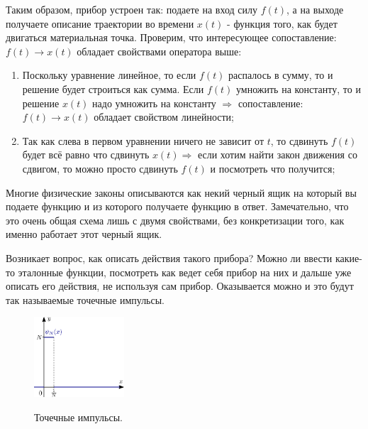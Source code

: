 \documentclass[12pt]{article}
\theoremstyle{definition}
\begin{document}
Таким образом, прибор устроен так: подаете на вход силу $f(t)$, а на выходе получаете описание траектории во времени $x(t)$ - функция того, как будет двигаться материальная точка. Проверим, что интересующее сопоставление: $f(t) \to x(t)$ обладает свойствами оператора выше:
\begin{enumerate}[label=(\arabic*)]
	\item Поскольку уравнение линейное, то если $f(t)$ распалось в сумму, то и решение будет строиться как сумма. Если $f(t)$ умножить на константу, то и решение $x(t)$ надо умножить на константу $\Rightarrow$ сопоставление: $f(t) \to x(t)$ обладает свойством линейности;
	
	\item Так как слева в первом уравнении ничего не зависит от $t$, то сдвинуть $f(t)$ будет всё равно что сдвинуть $x(t) \Rightarrow$ если хотим найти закон движения со сдвигом, то можно просто сдвинуть $f(t)$ и посмотреть что получится;
\end{enumerate}
Многие физические законы описываются как некий черный ящик на который вы подаете функцию и из которого получаете функцию в ответ. Замечательно, что это очень общая схема лишь с двумя свойствами, без конкретизации того, как именно работает этот черный ящик.

Возникает вопрос, как описать действия такого прибора? Можно ли ввести какие-то эталонные функции, посмотреть как ведет себя прибор на них и дальше уже описать его действия, не используя сам прибор. Оказывается можно и это будут так называемые точечные импульсы.

\begin{figure}[H]
	\centering
	\includegraphics[width=0.3\textwidth]{MA3L25_2.eps}
	\label{MA3L25_2}
	\caption{Точечные импульсы.}
	\label{fig: Функции точечных импульсов}
\end{figure}
\end{document}
